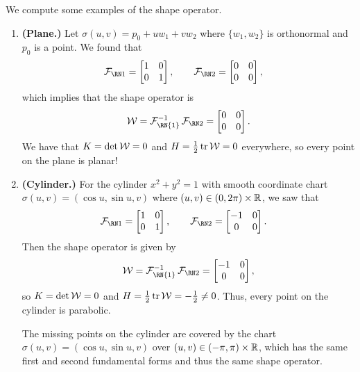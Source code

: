We compute some examples of the shape operator. 
\begin{enumerate}[(1)]
    \item {\bf (Plane.)} Let $\sigma(u, v) = p_0 + uw_1 + vw_2$ where 
    $\{w_1, w_2\}$ is orthonormal and $p_0$ is a point. We found that 
    \begin{align*}
        \FFF &= \begin{bmatrix}
            1 & 0 \\ 0 & 1 
        \end{bmatrix}, \qquad \SFF = \begin{bmatrix}
            0 & 0 \\ 0 & 0 
        \end{bmatrix},
    \end{align*}
    which implies that the shape operator is 
    \[ {\cal W} = {\cal F}_{\text{\RN{1}}}^{-1} \SFF = \begin{bmatrix}
        0 & 0 \\ 0 & 0 
    \end{bmatrix}. \] 
    We have that $K = \det{\cal W} = 0$ and $H = \frac12\operatorname{tr}{\cal W} = 0$ 
    everywhere, so every point on the plane is planar!

    \item {\bf (Cylinder.)} For the cylinder $x^2 + y^2 = 1$ with 
    smooth coordinate chart $\sigma(u, v) = (\cos u, \sin u, v)$ 
    where $(u, v) \in (0, 2\pi) \times \mathbb{R}$, we saw that 
    \begin{align*}
        \FFF &= \begin{bmatrix}
            1 & 0 \\ 0 & 1 
        \end{bmatrix}, \qquad \SFF = \begin{bmatrix}
            -1 & 0 \\ 0 & 0 
        \end{bmatrix}.
    \end{align*}
    Then the shape operator is given by 
    \[ {\cal W} = {\cal F}_{\text{\RN{1}}}^{-1} \SFF = \begin{bmatrix}
        -1 & 0 \\ 0 & 0 
    \end{bmatrix}, \] 
    so $K = \det{\cal W} = 0$ and $H = \frac12\operatorname{tr}{\cal W} = -\frac12 \neq 0$. 
    Thus, every point on the cylinder is parabolic. 

    The missing points on the cylinder are covered by the 
    chart $\sigma(u, v) = (\cos u, \sin u, v)$ over $(u, v) \in (-\pi, \pi)
    \times \mathbb{R}$, which has the same first and second fundamental forms 
    and thus the same shape operator. 


\end{enumerate}
